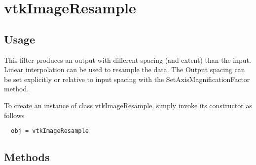 \section{vtkImageResample}

\subsection{Usage}

 This filter produces an output with different spacing (and extent)
 than the input.  Linear interpolation can be used to resample the data.
 The Output spacing can be set explicitly or relative to input spacing
 with the SetAxisMagnificationFactor method.

To create an instance of class vtkImageResample, simply
invoke its constructor as follows
\begin{verbatim}
  obj = vtkImageResample
\end{verbatim}
\subsection{Methods}

